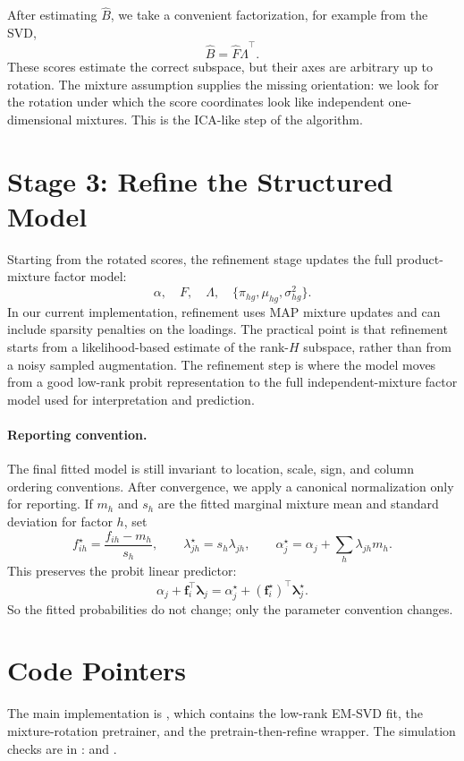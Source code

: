 \documentclass[11pt]{article}
\begin{document}
After estimating \(\widehat B\), we take a convenient factorization, for
example from the SVD,
\[
  \widehat B=\widehat F\widehat\Lambda^\top.
\]
These scores estimate the correct subspace, but their axes are arbitrary up
to rotation.  The mixture assumption supplies the missing orientation: we look
for the rotation under which the score coordinates look like independent
one-dimensional mixtures.  This is the ICA-like step of the algorithm.

\section{Stage 3: Refine the Structured Model}

Starting from the rotated scores, the refinement stage updates the full
product-mixture factor model:
\[
  \alpha,\quad F,\quad \Lambda,\quad
  \{\pi_{hg},\mu_{hg},\sigma^2_{hg}\}.
\]
In our current implementation, refinement uses MAP mixture updates and can
include sparsity penalties on the loadings.  The practical point is that
refinement starts from a likelihood-based estimate of the rank-\(H\) subspace,
rather than from a noisy sampled augmentation.  The refinement step is where
the model moves from a good low-rank probit representation to the full
independent-mixture factor model used for interpretation and prediction.

\paragraph{Reporting convention.}
The final fitted model is still invariant to location, scale, sign, and column
ordering conventions.  After convergence, we apply a canonical normalization
only for reporting.  If \(m_h\) and \(s_h\) are the fitted marginal mixture
mean and standard deviation for factor \(h\), set
\[
  f_{ih}^\star=\frac{f_{ih}-m_h}{s_h},
  \qquad
  \lambda_{jh}^\star=s_h\lambda_{jh},
  \qquad
  \alpha_j^\star=\alpha_j+\sum_h\lambda_{jh}m_h.
\]
This preserves the probit linear predictor:
\[
  \alpha_j+\bm f_i^\top\bm\lambda_j
  =
  \alpha_j^\star+(\bm f_i^\star)^\top\bm\lambda_j^\star.
\]
So the fitted probabilities do not change; only the parameter convention
changes.

\section{Code Pointers}

The main implementation is , which
contains the low-rank EM-SVD fit, the mixture-rotation pretrainer, and the
pretrain-then-refine wrapper.  The simulation checks are in
:  and
.
\end{document}
